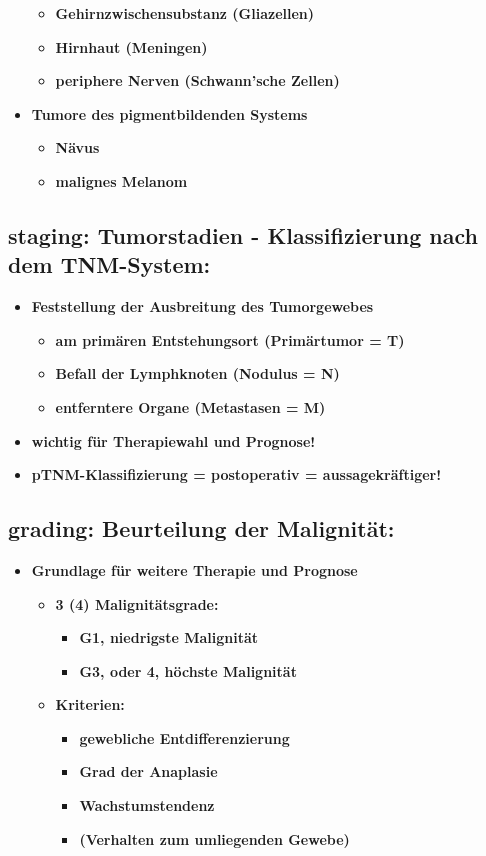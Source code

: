 \begin{itemize}
				\begin{itemize}
					\item \textbf{Gehirnzwischensubstanz (Gliazellen)}
					\item \textbf{Hirnhaut (Meningen)}
					\item \textbf{periphere Nerven (Schwann'sche Zellen)}
				\end{itemize}
			\item \textbf{Tumore des pigmentbildenden Systems}
				\begin{itemize}
					\item \textbf{Nävus}
					\item \textbf{malignes Melanom}
				\end{itemize}
		\end{itemize}
	\subsection{staging: Tumorstadien - Klassifizierung nach dem TNM-System:}
		\begin{itemize}
			\item \textbf{Feststellung der Ausbreitung des Tumorgewebes}
						\begin{itemize}
							\item \textbf{am primären Entstehungsort (Primärtumor = T)}
							\item \textbf{Befall der Lymphknoten (Nodulus = N)}
							\item \textbf{entferntere Organe (Metastasen = M)}
						\end{itemize}
			\item \textbf{wichtig für Therapiewahl und Prognose!}
			\item \textbf{pTNM-Klassifizierung = postoperativ = aussagekräftiger!}
		\end{itemize}
	\subsection{grading: Beurteilung der Malignität:}
		\begin{itemize}
			\item \textbf{Grundlage für weitere Therapie und Prognose}
				\begin{itemize}
					\item \textbf{3 (4) Malignitätsgrade:}
						\begin{itemize}
							\item \textbf{G1, niedrigste Malignität}
							\item \textbf{G3, oder 4,  höchste Malignität}
						\end{itemize}
					\item \textbf{Kriterien:}
						\begin{itemize}
							\item \textbf{gewebliche Entdifferenzierung}
							\item \textbf{Grad der Anaplasie}
							\item \textbf{Wachstumstendenz}
							\item \textbf{(Verhalten zum umliegenden Gewebe)}
						\end{itemize}
				\end{itemize}
		\end{itemize}
